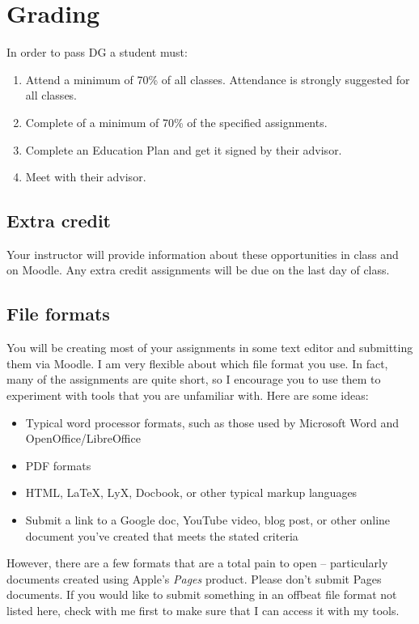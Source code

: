 \documentclass[12pt,article,oneside]{memoir}
\begin{document}
\section{Grading}

In order to pass DG a student must:

\begin{enumerate}
 \item Attend a minimum of 70\% of all classes.  Attendance is strongly suggested for all classes.
 \item Complete of a minimum of 70\% of the specified assignments.
 \item Complete an Education Plan and get it signed by their advisor.
 \item Meet with their advisor.
\end{enumerate}

  
\subsection{Extra credit}
Your instructor will provide information about these opportunities in class and on Moodle.  Any extra credit assignments will be due on the last day of class.

\subsection{File formats}
You will be creating most of your assignments in some text editor and submitting them via Moodle.  I am very flexible about which file format you use. In fact, many of the assignments are quite short, so I encourage you to use them to experiment with tools that you are unfamiliar with.  Here are some ideas:
\begin{itemize}
 \item Typical word processor formats, such as those used by Microsoft Word and OpenOffice/LibreOffice
 \item PDF formats
 \item HTML, \LaTeX, LyX,  Docbook, or other typical markup languages
 \item Submit a link to a Google doc, YouTube video, blog post, or other online document you've created that meets the stated criteria 
\end{itemize}



However, there are a few formats that are a total pain to open -- particularly documents created using Apple's \emph{Pages} product.  Please don't submit Pages documents. If you would like to submit something in an offbeat file format not listed here, check with me first to make sure that I can access it with my tools.
\end{document}
